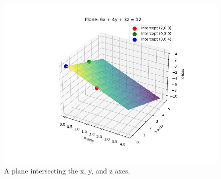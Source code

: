 \documentclass[journal]{IEEEtran}
\begin{document}
\begin{figure}[h!]
\begin{center}
\includegraphics[width=0.9\columnwidth]{figs/fig2.png}
\end{center}
\caption{A plane intersecting the x, y, and z axes.}
\label{fig:Fig.1}
\end{figure}
\end{document}
